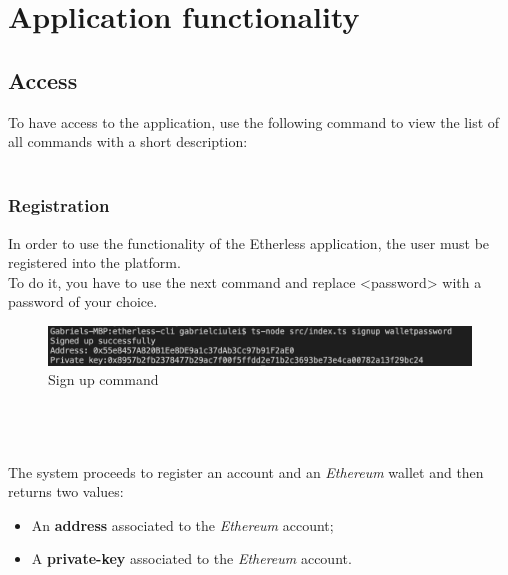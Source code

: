 \section{Application functionality}
\subsection{Access}
To have access to the application, use the following  command to view the list of all commands with a short description:
\\
\\
\centerline {}

\subsubsection{Registration}
In order to use the functionality of the Etherless application, the user must be registered into the platform.\\
To do it, you have to use the next command and replace <password>  with a password of your choice.
\\
\centerline{}
	\begin{figure}
		\centering
		\includegraphics[width=\textwidth]{res/img/Screenshot_signup.png/}
		\caption{Sign up command}
	\end{figure}\\
\\\\
The system proceeds to register an account and an \textit{Ethereum\glos} wallet  and then returns two values: 
\begin{itemize}
	\item An \textbf{address} associated to the \textit{Ethereum\glos} account;
	\item A \textbf{private-key\glos} associated to the \textit{Ethereum\glos} account.
\end{itemize}


